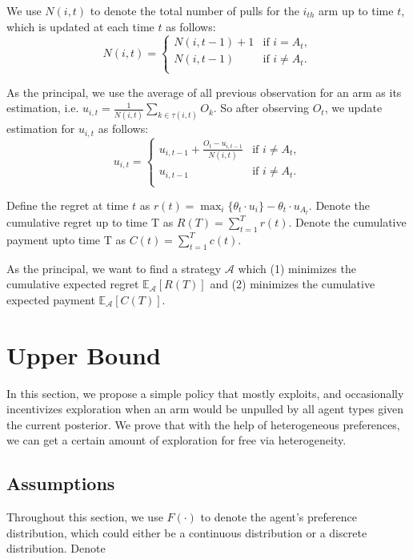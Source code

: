 \documentclass{article}
\begin{document}
We use $N(i,t)$ to denote the total number of pulls for the $i_{th}$ arm up to time $t$, which is updated at each time $t$ as follows:
\[ N(i,t) =
\begin{cases}
N(i,t-1) + 1       & \text{if } i = A_t, \\
N(i,t-1)  & \text{if } i \neq A_t. \\
\end{cases}
\]

As the principal, we use the average of all previous observation for an arm as its estimation, i.e. $u_{i,t}=\frac{1}{N(i,t)}\sum_{k\in \tau(i,t)}O_{k}$. So after observing $O_t$, we update estimation for $u_{i,t}$ as follows:
\[ u_{i,t} =
\begin{cases}
u_{i,t-1}+\frac{O_t-u_{i,t-1}}{N(i,t)} & \text{if } i \neq A_t, \\
u_{i,t-1}  & \text{if } i \neq A_t. \\
\end{cases}
\]

Define the regret at time $t$ as $r(t)=\max_{i}\{\theta_{t}\cdot u_{i}\}-\theta_t\cdot u_{A_t}$. Denote the cumulative regret up to time T as $R(T)=\sum_{t=1}^{T}r(t)$. Denote the cumulative payment upto time T as $C(t)=\sum_{t=1}^{T}c(t)$. 

As the principal, we want to find a strategy $\mathcal{A}$ which (1) minimizes the cumulative expected regret $\mathbb{E}_{\mathcal{A}}[R(T)]$ and (2) minimizes the cumulative expected payment $\mathbb{E}_{\mathcal{A}}[C(T)]$.

\section{Upper Bound}
\label{sec:ub}

In this section, we propose a simple policy that mostly exploits, and occasionally incentivizes exploration when an arm would be unpulled by all agent types given the current posterior. We prove that with the help of heterogeneous preferences, we can get a certain amount of exploration for free via heterogeneity. 



\subsection{Assumptions}
Throughout this section, we use $F(\cdot)$ to denote the agent's preference distribution, which could either be a continuous distribution or a discrete distribution. Denote
\end{document}

